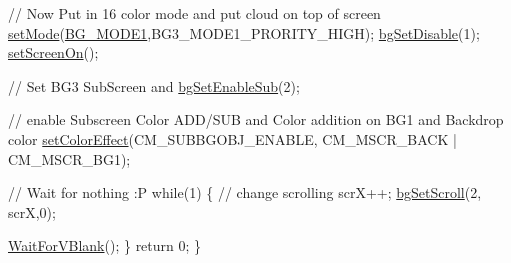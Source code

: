\begin{DoxyCodeInclude}
    \textcolor{comment}{// Now Put in 16 color mode and put cloud on top of screen}
    \hyperlink{a00353_afd9e46ae627d055dd8c98a4b0ebb73b1}{setMode}(\hyperlink{a00317_a05c862edb7f8f75036f10c04dcc3c2a6}{BG\_MODE1},BG3\_MODE1\_PRORITY\_HIGH); \hyperlink{a00317_a4dbfb1b8854ff9ca4a7d11a899281bbb}{bgSetDisable}(1);  
    \hyperlink{a00353_abc7d4ef8ebc22f5b710927909bb3f144}{setScreenOn}();

    \textcolor{comment}{// Set BG3 SubScreen and }
    \hyperlink{a00317_a439e34ab400075fa7f12e6e559407e9b}{bgSetEnableSub}(2);
    
    \textcolor{comment}{// enable Subscreen Color ADD/SUB and Color addition on BG1 and Backdrop color}
    \hyperlink{a00353_a87d6cb8ec2433c908666a0a7f2306cb4}{setColorEffect}(CM\_SUBBGOBJ\_ENABLE, CM\_MSCR\_BACK | CM\_MSCR\_BG1);

    \textcolor{comment}{// Wait for nothing :P}
    \textcolor{keywordflow}{while}(1) \{
        \textcolor{comment}{// change scrolling }
        scrX++; 
        \hyperlink{a00317_aa5e0112ea2d4b514c2dddc6ed2c7c3c7}{bgSetScroll}(2, scrX,0);

        \hyperlink{a00326_a815e2626bd26d0e936d507a363ecd723}{WaitForVBlank}();
    \}
    \textcolor{keywordflow}{return} 0;
\}
\end{DoxyCodeInclude}
 